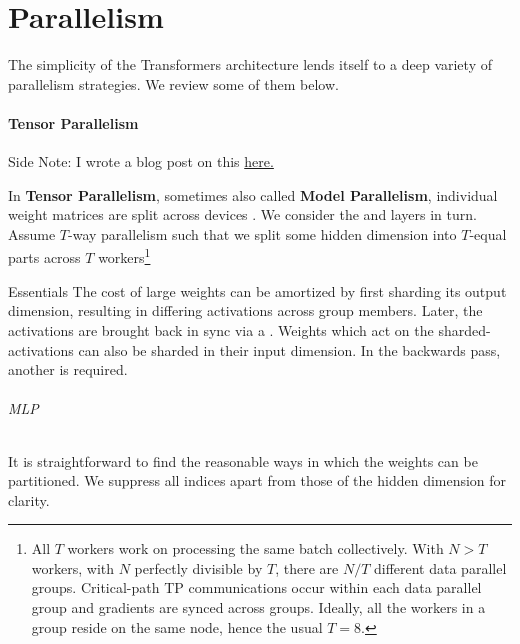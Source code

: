 \documentclass[11pt]{article}
\begin{document}
\newpage

\part{Parallelism}

The simplicity of the Transformers architecture lends itself to a deep variety of parallelism
strategies. We review some of them below.

\subsection{Tensor Parallelism \label{subsec_tensor_parallelism} }

\begin{commentbox}{Side Note: }
    I wrote a blog post on this \href{https://www.determined.ai/blog/tp}{here.}
\end{commentbox}


In \textbf{Tensor Parallelism}, sometimes also called \textbf{Model Parallelism}, individual weight
matrices are split across devices \cite{shoeybi2020megatronlm}. We consider the  and
 layers in turn. Assume $ T $-way parallelism such that we split some
hidden dimension into $ T $-equal parts across $ T $ workers\footnote{All $ T $ workers work on
    processing the same batch collectively.  With $ N>T $ workers, with $ N $ perfectly divisible by
    $ T $, there are $ N/T $ different data parallel groups. Critical-path TP communications occur
    within each data parallel group and gradients are synced across groups. Ideally, all the workers
    in a group reside on the same node, hence the usual $ T=8 $.}


\begin{nicebox}{Essentials}
	The cost of large weights can be amortized by first sharding its output dimension, resulting in
	differing activations across group members. Later, the activations are brought back in sync via
	a . Weights which act on the sharded-activations can also be sharded in their
	input dimension. In the backwards pass, another  is required.
\end{nicebox}

\paragraph{MLP}
It is straightforward to find the reasonable ways in which the weights can be partitioned. We
suppress all indices apart from those of the hidden dimension for clarity.
\end{document}
